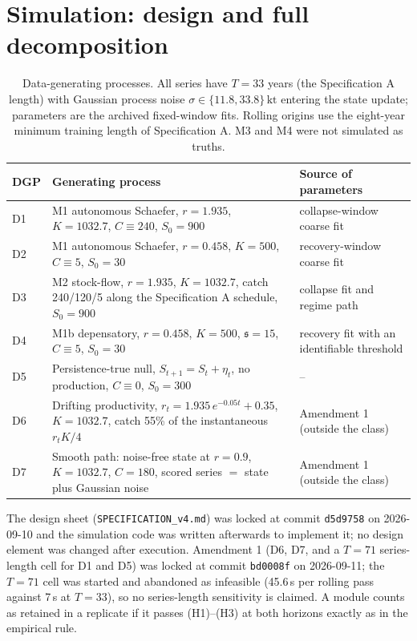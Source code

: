 \documentclass[preprint,11pt,authoryear]{elsarticle}
\theoremstyle{remark}
\newcommand{\kt}{\,\mathrm{kt}}
\newcommand{\sA}{\mathfrak{s}}
\begin{document}
\FloatBarrier
\section{Simulation: design and full decomposition}\label{si:sim}

\begin{table}[!htb]
\centering\footnotesize\setlength{\tabcolsep}{3.5pt}
\caption{Data-generating processes. All series have $T=33$ years (the Specification A length) with Gaussian process noise $\sigma\in\{11.8, 33.8\}\kt$ entering the state update; parameters are the archived fixed-window fits. Rolling origins use the eight-year minimum training length of Specification A. M3 and M4 were not simulated as truths.}
\label{tab:si_dgp}
\begin{tabularx}{\textwidth}{@{}lLL@{}}
\toprule
DGP & Generating process & Source of parameters \\
\midrule
D1 & M1 autonomous Schaefer, $r=1.935$, $K=1032.7$, $C\equiv 240$, $S_0 = 900$ & collapse-window coarse fit \\
D2 & M1 autonomous Schaefer, $r=0.458$, $K=500$, $C\equiv 5$, $S_0 = 30$ & recovery-window coarse fit \\
D3 & M2 stock-flow, $r=1.935$, $K=1032.7$, catch 240/120/5 along the Specification A schedule, $S_0=900$ & collapse fit and regime path \\
D4 & M1b depensatory, $r=0.458$, $K=500$, $\sA=15$, $C\equiv 5$, $S_0=30$ & recovery fit with an identifiable threshold \\
D5 & Persistence-true null, $S_{t+1} = S_t + \eta_t$, no production, $C\equiv 0$, $S_0=300$ & -- \\
D6 & Drifting productivity, $r_t = 1.935\,e^{-0.05t} + 0.35$, $K=1032.7$, catch 55\% of the instantaneous $r_tK/4$ & Amendment 1 (outside the class) \\
D7 & Smooth path: noise-free state at $r=0.9$, $K=1032.7$, $C=180$, scored series $=$ state plus Gaussian noise & Amendment 1 (outside the class) \\
\bottomrule
\end{tabularx}
\end{table}

The design sheet (\texttt{SPECIFICATION\_v4.md}) was locked at commit \texttt{d5d9758} on 2026-09-10 and the simulation code was written afterwards to implement it; no design element was changed after execution. Amendment 1 (D6, D7, and a $T=71$ series-length cell for D1 and D5) was locked at commit \texttt{bd0008f} on 2026-09-11; the $T=71$ cell was started and abandoned as infeasible (45.6\,s per rolling pass against 7\,s at $T=33$), so no series-length sensitivity is claimed. A module counts as retained in a replicate if it passes (H1)--(H3) at both horizons exactly as in the empirical rule.
\end{document}
